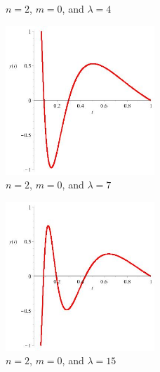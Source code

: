 \documentclass[executivepaper]{article}
\begin{document}
\begin{center}
\begin{figure}[H]
\caption{$n=2$, $m=0$, and $\lambda=4$}

\end{figure}

\pagebreak

\vspace*{-40mm}

\begin{figure}[H]

\centering

\includegraphics[width=0.5\textwidth]{NEquals2MEquals0LambdaEquals7}

\caption{$n=2$, $m=0$, and $\lambda=7$}

\end{figure}

\begin{figure}[H]

\centering

\includegraphics[width=0.5\textwidth]{NEquals2MEquals0LambdaEquals15}

\caption{$n=2$, $m=0$, and $\lambda=15$}

\end{figure}

\pagebreak

\vspace*{-40mm}


\end{center}
\end{document}
